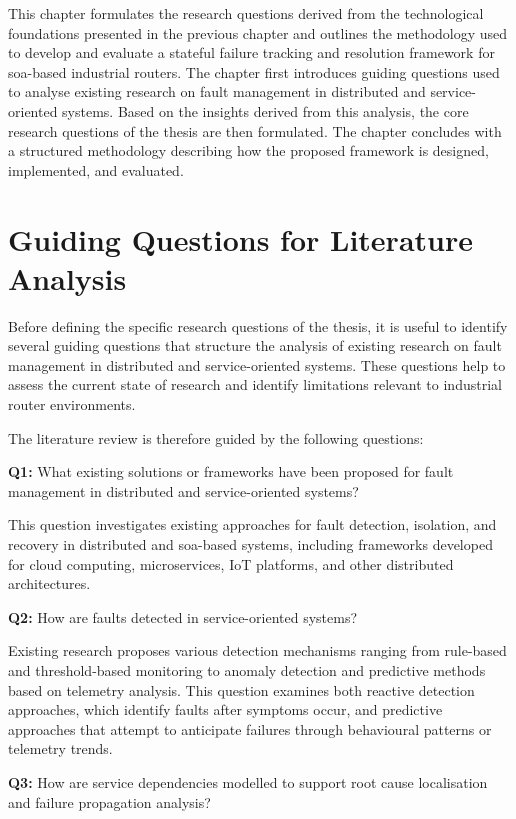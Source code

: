 This chapter formulates the research questions derived from the technological foundations presented in the previous chapter and outlines the methodology used to develop and evaluate a stateful failure tracking and resolution framework for \gls{soa}-based industrial routers. The chapter first introduces guiding questions used to analyse existing research on fault management in distributed and service-oriented systems. Based on the insights derived from this analysis, the core research questions of the thesis are then formulated. The chapter concludes with a structured methodology describing how the proposed framework is designed, implemented, and evaluated.

\section{Guiding Questions for Literature Analysis}\label{sec:guiding-questions}

Before defining the specific research questions of the thesis, it is useful to identify several guiding questions that structure the analysis of existing research on fault management in distributed and service-oriented systems. These questions help to assess the current state of research and identify limitations relevant to industrial router environments.

The literature review is therefore guided by the following questions:

\textbf{Q1:} What existing solutions or frameworks have been proposed for fault management in distributed and service-oriented systems?

This question investigates existing approaches for fault detection, isolation, and recovery in distributed and \gls{soa}-based systems, including frameworks developed for cloud computing, microservices, IoT platforms, and other distributed architectures.

\textbf{Q2:} How are faults detected in service-oriented systems?

Existing research proposes various detection mechanisms ranging from rule-based and threshold-based monitoring to anomaly detection and predictive methods based on telemetry analysis. This question examines both reactive detection approaches, which identify faults after symptoms occur, and predictive approaches that attempt to anticipate failures through behavioural patterns or telemetry trends.

\textbf{Q3:} How are service dependencies modelled to support root cause localisation and failure propagation analysis?

